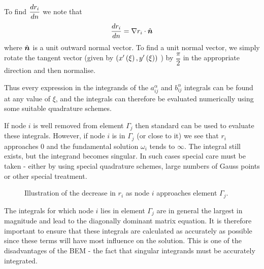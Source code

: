 To find $ \dfrac{ d r_{i}}{d n} $  we note that  
\begin{equation}
   \dfrac{ d r_{i}}{d n}  = \nabla r_{i}\cdot\hat{\boldsymbol{n}}
  \label{eqn:dridn}
\end{equation}
where $\hat{\boldsymbol{n}}$ is a unit outward normal vector.  To find a unit normal
vector, we simply rotate the tangent vector (given by
$\left(  x'\left( \xi \right) , y'\left( \xi \right)  \right)$ ) by $\dfrac{\pi}{2}$ in the
appropriate direction and then normalise.

Thus every expression in the integrands of the $a_{ij}^{\alpha}$ and
$b_{ij}^{\alpha}$ integrals can be found at any value of $\xi$, and the
integrals can therefore be evaluated numerically using some suitable
quadrature schemes.

If node $i$ is well removed from element $\Gamma_{j}$ then standard 
 can be used to evaluate these integrals.  However,
if node $i$ is in $\Gamma_{j}$ (or close to it) we see that $r_{i}$ approaches
0 and the fundamental solution $\omega_{i}$ tends to $\infty$.  The integral
still exists, but the integrand becomes singular.  In such cases special care
must be taken - either by using special quadrature schemes, large numbers of
Gauss points or other special treatment.

\begin{figure}[htbp] \centering
  
  \caption{Illustration of the decrease in $r_{i}$ as node $i$ approaches 
    element $\Gamma_{j}$.}
  \label{fig:decri}
\end{figure}

The integrals for which node $i$ lies in element $\Gamma_{j}$ are in general
the largest in magnitude and lead to the diagonally dominant matrix equation.
It is therefore important to ensure that these integrals are calculated as
accurately as possible since these terms will have most influence on the
solution.  This is one of the disadvantages of the BEM - the fact that
singular integrands must be accurately integrated.

